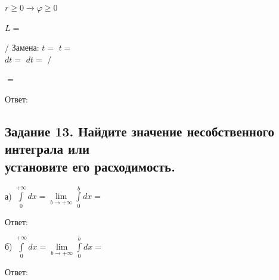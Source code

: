 \documentclass[12pt]{article}
\begin{document}
$r\geq 0 \rightarrow \varphi \geq 0 $\vspace{2.5mm}

$L=$\vspace{2.5mm}

/ Замена: $t= $  \hspace{2.5mm}  $t=$ \vspace{2.5mm}\\
$dt=$ \hspace{2.5mm} $dt=$ /\vspace{2.5mm}

$=$\vspace{2.5mm}

Ответ: $ $

\subsection*{Задание 13. Найдите значение несобственного интеграла или\\установите его расходимость.}

а) $\int\limits^{+\infty }_{0}dx=\lim\limits _{b\to +\infty }\int\limits^{b}_{0}dx=$\vspace{2.5mm}

Ответ: $ $\vspace{2.5mm}

б) $\int\limits^{+\infty }_{0}dx=\lim\limits _{b\to +\infty }\int\limits^{b}_{0}dx=$\vspace{2.5mm}

Ответ: $ $
\end{document}
